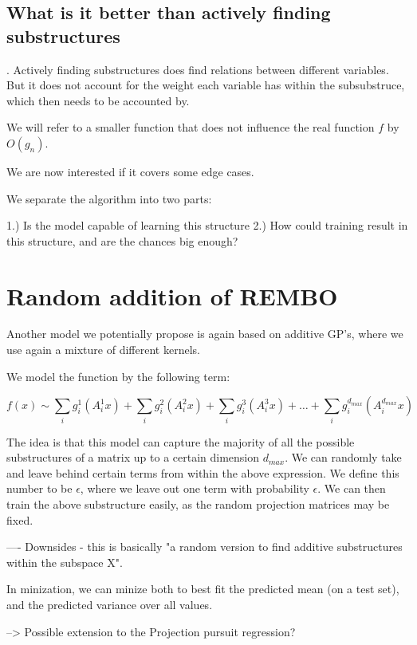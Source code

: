 \subsection{What is it better than actively finding substructures}.
Actively finding substructures does find relations between different variables.
But it does not account for the weight each variable has within the subsubstruce, which then needs to be accounted by.

We will refer to a smaller function that does not influence the real function $f$ by $O(g_n)$.

We are now interested if it covers some edge cases.

We separate the algorithm into two parts:

1.) Is the model capable of learning this structure
2.) How could training result in this structure, and are the chances big enough?


\section{Random addition of REMBO}
Another model we potentially propose is again based on additive GP's, where we use again a mixture of different kernels.

We model the function by the following term:


\begin{equation}
f(x) \sim \sum_i g_i^1(A_i^1 x) + \sum_i g_i^2(A_i^2 x) + \sum_i g_i^3(A_i^3 x) + \ldots + \sum_i g_i^{d_{max}}(A_i^{d_{max}} x)
\end{equation}

The idea is that this model can capture the majority of all the possible substructures of a matrix up to a certain dimension $d_{max}$.
We can randomly take and leave behind certain terms from within the above expression.
We define this number to be $\epsilon$, where we leave out one term with probability $\epsilon$.
We can then train the above substructure easily, as the random projection matrices may be fixed.

----
Downsides - this is basically "a random version to find additive substructures within the subspace X".

In minization, we can minize both to best fit the predicted mean (on a test set), and the predicted variance over all values.

--> Possible extension to the Projection pursuit regression?

